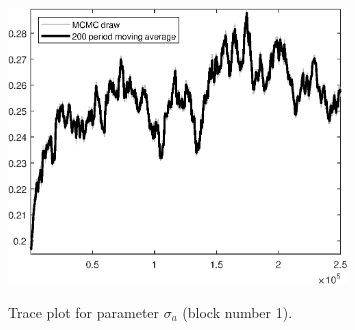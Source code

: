 \begin{figure}[H]
\centering
  \includegraphics[width=0.8\textwidth]{BRS_extended_fd/graphs/TracePlot_sigma_a_blck_1}\\
    \caption{Trace plot for parameter ${\sigma_a}$ (block number 1).}
\end{figure}
